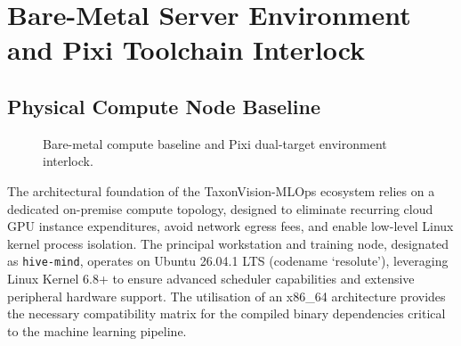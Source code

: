 \chapter{Bare-Metal Server Environment and Pixi Toolchain Interlock}
\label{ch:bare_metal_host}


\section{Physical Compute Node Baseline}
\label{sec:physical_compute_node}

\begin{figure}[htbp]
\centering

\caption{Bare-metal compute baseline and Pixi dual-target environment interlock.}
\label{fig:pixi_toolchain_dual_target}
\end{figure}

The architectural foundation of the TaxonVision-MLOps ecosystem relies on a dedicated on-premise compute topology, designed to eliminate recurring cloud GPU instance expenditures, avoid network egress fees, and enable low-level Linux kernel process isolation. The principal workstation and training node, designated as \texttt{hive-mind}, operates on Ubuntu 26.04.1 LTS (codename `resolute'), leveraging Linux Kernel 6.8+ to ensure advanced scheduler capabilities and extensive peripheral hardware support. The utilisation of an x86\_64 architecture provides the necessary compatibility matrix for the compiled binary dependencies critical to the machine learning pipeline.

